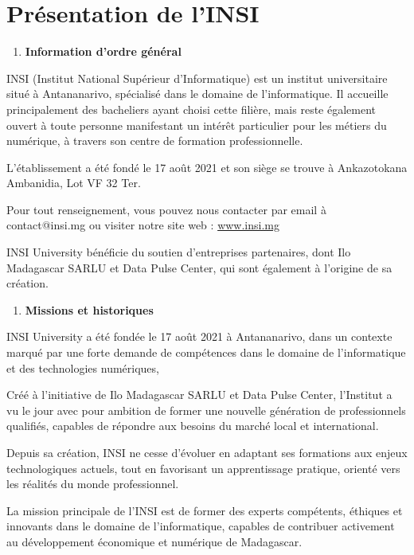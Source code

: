 \chapter*{Présentation de l'INSI}

\begin{enumerate}
	\def\labelenumi{\arabic{enumi}.}
	\item
	\textbf{Information d'ordre général}
\end{enumerate}
INSI (Institut National Supérieur d'Informatique) est un institut
universitaire situé à Antananarivo, spécialisé dans le domaine de
l'informatique. Il accueille principalement des bacheliers ayant choisi
cette filière, mais reste également ouvert à toute personne manifestant
un intérêt particulier pour les métiers du numérique, à travers son
centre de formation professionnelle.

L'établissement a été fondé le 17 août 2021 et son siège se
trouve à Ankazotokana Ambanidia, Lot VF 32 Ter.

Pour tout renseignement, vous pouvez nous contacter par email à
contact@insi.mg ou visiter notre site web :
\href{http://www.insi.mg/}{www.insi.mg}

INSI University bénéficie du soutien d'entreprises partenaires, dont
Ilo Madagascar SARLU et Data Pulse Center, qui sont
également à l'origine de sa création.

\begin{enumerate}
	\def\labelenumi{\arabic{enumi}.}
	\setcounter{enumi}{1}
	\item
	\textbf{Missions et historiques}
\end{enumerate}

INSI University a été fondée le 17 août 2021 à Antananarivo,
dans un contexte marqué par une forte demande de compétences dans le
domaine de l'informatique et des technologies numériques,

Créé à l'initiative de Ilo Madagascar SARLU et Data
	Pulse Center, l'Institut a vu le jour avec pour ambition de former une
nouvelle génération de professionnels qualifiés, capables de répondre
aux besoins du marché local et international.

Depuis sa création, INSI ne cesse d'évoluer en adaptant ses formations
aux enjeux technologiques actuels, tout en favorisant un apprentissage
pratique, orienté vers les réalités du monde professionnel.

La mission principale de l'INSI est de former des experts
	compétents, éthiques et innovants dans le domaine de l'informatique,
capables de contribuer activement au développement économique et
numérique de Madagascar.

